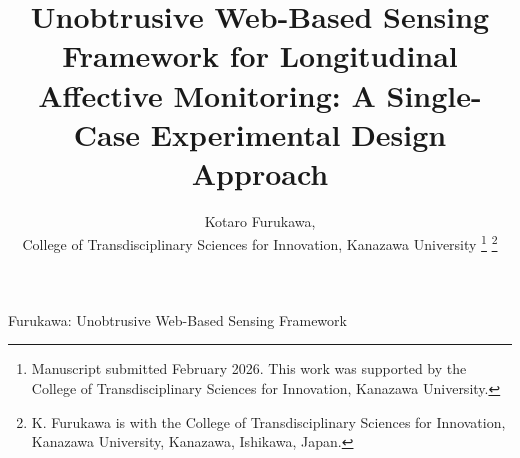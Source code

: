 \documentclass[journal]{IEEEtran}
\begin{document}
\title{Unobtrusive Web-Based Sensing Framework for Longitudinal Affective Monitoring: A Single-Case Experimental Design Approach}

\author{Kotaro Furukawa, \\ College of Transdisciplinary Sciences for Innovation, Kanazawa University%
\thanks{Manuscript submitted February 2026. This work was supported by the College of Transdisciplinary Sciences for Innovation, Kanazawa University.}
\thanks{K. Furukawa is with the College of Transdisciplinary Sciences for Innovation, Kanazawa University, Kanazawa, Ishikawa, Japan.}}

%
{Furukawa: Unobtrusive Web-Based Sensing Framework}

\maketitle
\end{document}
